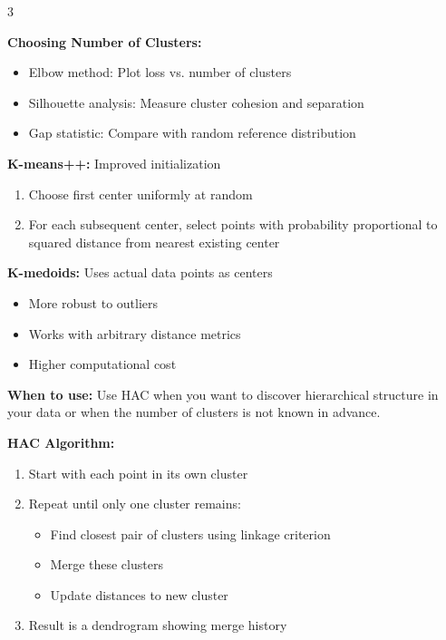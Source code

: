 \documentclass[10pt,landscape]{article}
\begin{document}
\begin{multicols}{3}
\begin{tcolorbox}[breakable, title=5.1 K-means Clustering, colback=clustering]
\textbf{Choosing Number of Clusters:}
\begin{itemize}[leftmargin=*,noitemsep,topsep=0pt]
    \item Elbow method: Plot loss vs. number of clusters
    \item Silhouette analysis: Measure cluster cohesion and separation
    \item Gap statistic: Compare with random reference distribution
\end{itemize}

\textbf{K-means++:} Improved initialization
\begin{enumerate}[leftmargin=*,noitemsep,topsep=0pt]
    \item Choose first center uniformly at random
    \item For each subsequent center, select points with probability proportional to squared distance from nearest existing center
\end{enumerate}

\textbf{K-medoids:} Uses actual data points as centers
\begin{itemize}[leftmargin=*,noitemsep,topsep=0pt]
    \item More robust to outliers
    \item Works with arbitrary distance metrics
    \item Higher computational cost
\end{itemize}
\end{tcolorbox}

\begin{tcolorbox}[breakable, title=5.2 Hierarchical Agglomerative Clustering, colback=clustering]
\textbf{When to use:} Use HAC when you want to discover hierarchical structure in your data or when the number of clusters is not known in advance.

\textbf{HAC Algorithm:}
\begin{enumerate}[leftmargin=*,noitemsep,topsep=0pt]
    \item Start with each point in its own cluster
    \item Repeat until only one cluster remains:
    \begin{itemize}[leftmargin=*,noitemsep]
        \item Find closest pair of clusters using linkage criterion
        \item Merge these clusters
        \item Update distances to new cluster
    \end{itemize}
    \item Result is a dendrogram showing merge history
\end{enumerate}


\end{tcolorbox}
\end{multicols}
\end{document}
